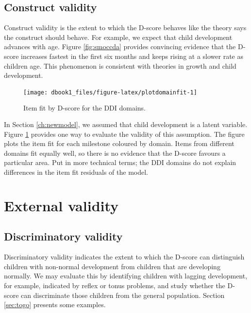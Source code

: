 \documentclass[
]{book}
\begin{document}
\hypertarget{construct-validity}{%
\subsection{Construct validity}\label{construct-validity}}

Construct validity is the extent to which the D-score behaves like the theory says the construct should behave. For example, we expect that child development advances with age. Figure \ref{fig:smoccda} provides convincing evidence that the D-score increases fastest in the first six months and keeps rising at a slower rate as children age. This phenomenon is consistent with theories in growth and child development.

\begin{figure}

{\centering \texttt{[image: dbook1\_files/figure-latex/plotdomainfit-1]} 

}

\caption{Item fit by D-score for the DDI domains.}\label{fig:plotdomainfit}
\end{figure}



In Section \ref{ch:newmodel}, we assumed that child development is a latent variable. Figure \ref{fig:plotdomainfit} provides one way to evaluate the validity of this assumption. The figure plots the item fit for each milestone coloured by domain. Items from different domains fit equally well, so there is no evidence that the D-score favours a particular area. Put in more technical terms; the DDI domains do not explain differences in the item fit residuals of the model.

\hypertarget{sec:external}{%
\section{External validity}\label{sec:external}}

\hypertarget{discriminatory-validity}{%
\subsection{Discriminatory validity}\label{discriminatory-validity}}

Discriminatory validity indicates the extent to which the D-score can distinguish children with non-normal development from children that are developing normally. We may evaluate this by identifying children with lagging development, for example, indicated by reflex or tonus problems, and study whether the D-score can discriminate those children from the general population. Section \ref{sec:togo} presents some examples.
\end{document}
